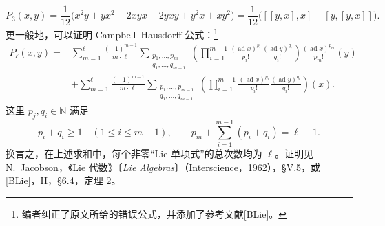 \[
  P_3(x,y)
  =
  \frac1{12}
  \bigl(
    x^2y+yx^2-2xyx-2yxy+y^2x+xy^2
  \bigr)
  =
  \frac1{12}
  \bigl(
    [[y,x],x]+[y,[y,x]]
  \bigr).
\]
更一般地，可以证明 Campbell--Hausdorff 公式：\footnote{%
\label{sga3:VIIB:nde:124}编者纠正了原文所给的错误公式，并添加了参考文献\textup{[BLie]}。}
\label{sga3:VIIB:3.2.1:campbell-hausdorff}
\[
\begin{aligned}
  P_\ell(x,y)
  ={}&
  \sum_{m=1}^{\ell}
  \frac{(-1)^{m-1}}{m\cdot\ell}
  \sum_{\substack{
    p_1,\ldots,p_m\\
    q_1,\ldots,q_{m-1}
  }}
  \left(
    \prod_{i=1}^{m-1}
    \frac{(\operatorname{ad}x)^{p_i}}{p_i!}
    \frac{(\operatorname{ad}y)^{q_i}}{q_i!}
  \right)
  \frac{(\operatorname{ad}x)^{p_m}}{p_m!}(y)
  \\
  &+
  \sum_{m=1}^{\ell}
  \frac{(-1)^{m-1}}{m\cdot\ell}
  \sum_{\substack{
    p_1,\ldots,p_{m-1}\\
    q_1,\ldots,q_{m-1}
  }}
  \left(
    \prod_{i=1}^{m-1}
    \frac{(\operatorname{ad}x)^{p_i}}{p_i!}
    \frac{(\operatorname{ad}y)^{q_i}}{q_i!}
  \right)(x).
\end{aligned}
\]
这里 \(p_j,q_i\in\mathbb N\) 满足
\[
  p_i+q_i\geq1
  \quad(1\leq i\leq m-1),
  \qquad
  p_m+\sum_{i=1}^{m-1}(p_i+q_i)=\ell-1.
\]
换言之，在上述求和中，每个非零“Lie 单项式”的总次数均为 \(\ell\)。证明见 N.~Jacobson，《Lie 代数》〔\emph{Lie Algebras}〕（Interscience，1962），\S V.5，或\textup{[BLie]}，II，\S6.4，定理 2。
